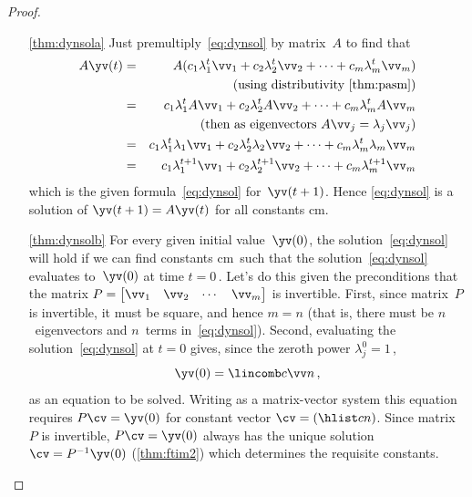 \begin{proof} \ 
\begin{itemize}
\item[\ref{thm:dynsola}] 
Just premultiply~\eqref{eq:dynsol} by matrix~\(A\) to find that
\begin{eqnarray*}
A\yv(t)&=&A(c_1\lambda_1^t\vv_1+c_2\lambda_2^t\vv_2+\cdots+c_m\lambda_m^t\vv_m)
\\&&\quad(\text{using distributivity \autoref{thm:pasm}})
\\&=&c_1\lambda_1^tA\vv_1+c_2\lambda_2^tA\vv_2+\cdots+c_m\lambda_m^tA\vv_m
\\&&\quad(\text{then as eigenvectors }A\vv_j=\lambda_j\vv_j)
\\&=&c_1\lambda_1^t\lambda_1\vv_1+c_2\lambda_2^t\lambda_2\vv_2+\cdots+c_m\lambda_m^t\lambda_m\vv_m
\\&=&c_1\lambda_1^{t+1}\vv_1+c_2\lambda_2^{t+1}\vv_2+\cdots+c_m\lambda_m^{t+1}\vv_m
\end{eqnarray*}
which is the given formula~\eqref{eq:dynsol} for~\(\yv(t+1)\).
Hence \eqref{eq:dynsol} is a solution of \(\yv(t+1)=A\yv(t)\) for all constants \hlist cm.

\item[\ref{thm:dynsolb}]
For every given initial value~\(\yv(0)\), the solution~\eqref{eq:dynsol} will hold if we can find constants \hlist cm\ such that the solution~\eqref{eq:dynsol} evaluates to~\(\yv(0)\) at time \(t=0\)\,.
Let's do this given the preconditions that 
the matrix \(P=\begin{bmatrix} \vv_1&\vv_2&\cdots&\vv_m \end{bmatrix}\) is {invertible}.
First, since matrix~\(P\) is invertible, it must be square, and hence \(m=n\) (that is, there must be \(n\)~eigenvectors and \(n\)~terms in~\eqref{eq:dynsol}).
Second, evaluating the solution~\eqref{eq:dynsol} at \(t=0\) gives, since the zeroth power \(\lambda_j^0=1\)\,,
\begin{equation*}
\yv(0)=\lincomb c\vv n\,,
\end{equation*}
as an equation to be solved.
Writing as a matrix-vector system this equation requires \(P\cv=\yv(0)\) for constant vector \(\cv=(\hlist cn)\).
Since matrix~\(P\) is invertible, \(P\cv=\yv(0)\) always has the unique solution \(\cv=P^{-1}\yv(0)\) (\autoref{thm:ftim2}) which determines the requisite constants.
\end{itemize}
\end{proof}




